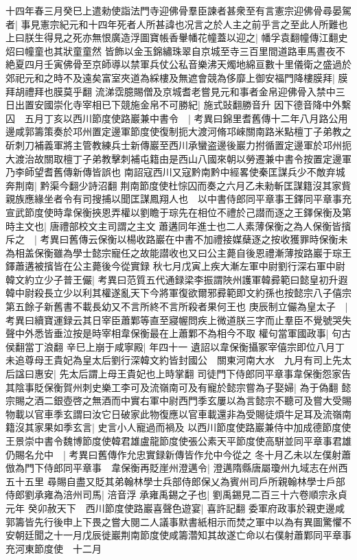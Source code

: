 十四年春三月癸巳上遣勑使詣法門寺迎佛骨羣臣諫者甚衆至有言憲宗迎佛骨尋晏駕者|{
	事見憲宗紀元和十四年死者人所甚諱也况言之於人主之前乎言之至此人所難也}
上曰朕生得見之死亦無恨廣造浮圖寶帳香轝幡花幢蓋以迎之|{
	幡孚袁翻幢傳江翻史炤曰幢童也其狀童童然}
皆飾以金玉錦繡珠翠自京城至寺三百里間道路車馬晝夜不絶夏四月壬寅佛骨至京師導以禁軍兵仗公私音樂沸天燭地綿亘數十里儀衛之盛過於郊祀元和之時不及遠矣富室夾道為綵樓及無遮會競為侈靡上御安福門降樓膜拜|{
	膜拜胡禮拜也膜莫乎翻}
流涕霑臆賜僧及京城耆老嘗見元和事者金帛迎佛骨入禁中三日出置安國崇化寺宰相已下競施金帛不可勝紀|{
	施式䜴翻勝音升}
因下德音降中外繫囚　五月丁亥以西川節度使路巖兼中書令　|{
	考異曰錦里耆舊傳十二年八月路公用邊咸郭籌策奏於邛州置定邊軍節度使復制扼大渡河脩邛崍關南路米點檀丁子弟教之斫刺刀補義軍將主管教練兵士新傳巖至西川承蠻盗邊後巖力拊循置定邊軍於邛州扼大渡治故關取檀丁子弟教擊刺補屯籍由是西山八國來朝以勞遷兼中書令按置定邊軍乃李師望耆舊傳新傳皆誤也}
南詔寇西川又寇黔南黔中經畧使秦匡謀兵少不敵弃城奔荆南|{
	黔渠今翻少詩沼翻}
荆南節度使杜悰囚而奏之六月乙未勑斬匡謀籍沒其家貲親族應緣坐者令有司搜捕以聞匡謀鳳翔人也　以中書侍郎同平章事王鐸同平章事充宣武節度使時韋保衡挾恩弄權以劉瞻于琮先在相位不禮於己譛而逐之王鐸保衡及第時主文也|{
	唐禮部校文主司謂之主文}
蕭遘同年進士也二人素薄保衡之為人保衡皆擯斥之　|{
	考異曰舊傳云保衡以楊收路巖在中書不加禮接媒蘖逐之按收獲罪時保衡未為相盖保衡雖為學士懿宗寵任之故能譛收也又曰公主薨自後恩禮漸薄按路巖于琮王鐸蕭遘被擯皆在公主薨後今從實録}
秋七月戊寅上疾大漸左軍中尉劉行深右軍中尉韓文約立少子普王儼|{
	考異曰范質五代通録梁李振謂陜州護軍韓彛範曰懿皇初升遐韓中尉殺長立少以利其權遂亂天下今將軍復欲爾邪彛範即文約孫也按懿宗八子僖宗第五餘子新舊書不載長幼又不言所終不言所殺者果何王也}
庚辰制立儼為皇太子　|{
	考異曰續寶運録云其日宰臣蕭鄴等直至寢幄問疾上微道朕三字而止羣臣不覺號哭失聲中外悉皆垂泣按是時宰相韋保衡最在上蕭鄴不為相今不取}
權句當軍國政事|{
	句古侯翻當丁浪翻}
辛巳上崩于咸寧殿|{
	年四十一}
遺詔以韋保衡攝冢宰僖宗即位八月丁未追尊母王貴妃為皇太后劉行深韓文約皆封國公　關東河南大水　九月有司上先太后諡曰惠安|{
	先太后謂上母王貴妃也上時掌翻}
司徒門下侍郎同平章事韋保衡怨家告其陰事貶保衡賀州刺史樂工李可及流嶺南可及有寵於懿宗嘗為子娶婦|{
	為于偽翻}
懿宗賜之酒二銀壺啓之無酒而中實右軍中尉西門季玄屢以為言懿宗不聽可及嘗大受賜物載以官車季玄謂曰汝它日破家此物復應以官車載還非為受賜徒煩牛足耳及流嶺南籍沒其家果如季玄言|{
	史言小人寵過而禍及}
以西川節度使路巖兼侍中加成德節度使王景崇中書令魏博節度使韓君雄盧龍節度使張公素天平節度使高駢並同平章事君雄仍賜名允中　|{
	考異曰舊傳作允忠實録新傳皆作允中今從之}
冬十月乙未以左僕射蕭倣為門下侍郎同平章事　韋保衡再貶崖州澄邁令|{
	澄邁隋縣唐屬瓊州九域志在州西五十五里}
尋賜自盡又貶其弟翰林學士兵部侍郎保乂為賓州司戶所親翰林學士戶部侍郎劉承雍為涪州司馬|{
	涪音浮}
承雍禹錫之子也|{
	劉禹錫見二百三十六卷順宗永貞元年}
癸卯赦天下　西川節度使路巖喜聲色遊宴|{
	喜許記翻}
委軍府政事於親吏邊咸郭籌皆先行後申上下畏之嘗大閱二人議事默書紙相示而焚之軍中以為有異圖驚懼不安朝廷聞之十一月戊辰徙巖荆南節度使咸籌濳知其故遂亡命以右僕射蕭鄴同平章事充河東節度使　十二月

